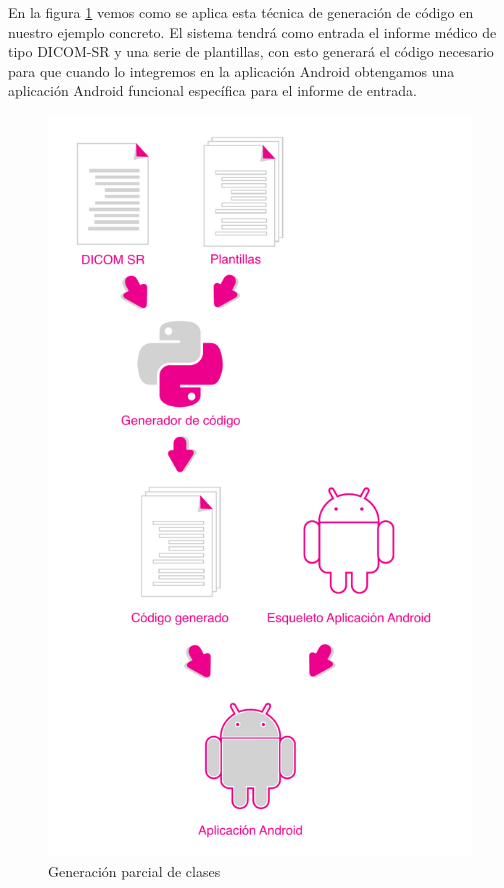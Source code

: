 En la figura \ref{fig:generacion} vemos como se aplica esta técnica de generación de código en nuestro ejemplo concreto. El sistema tendrá como entrada el informe médico de tipo DICOM-SR y una serie de plantillas, con esto generará el código necesario para que cuando lo integremos en la aplicación Android obtengamos una aplicación Android funcional específica para el informe de entrada. \par
\begin{figure}[ht]
\centering
\includegraphics[scale=0.5]{./imgs/esquemas/generacion.pdf}
\caption{Generación parcial de clases}
\label{fig:generacion}
\end{figure}

